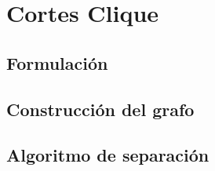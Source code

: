 \section{Cortes Clique}

\bigskip
\subsection{Formulaci\'on}

\bigskip
\subsection{Construcci\'on del grafo}


\bigskip
\subsection{Algoritmo de separaci\'on}
